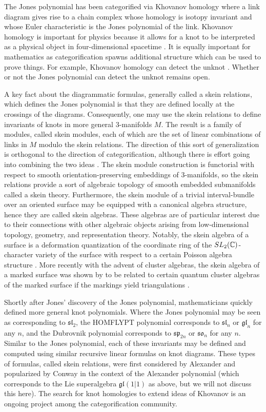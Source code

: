 The Jones polynomial has been categorified via Khovanov homology \cite{Kho00} where a link diagram gives rise to a chain complex whose homology is isotopy invariant and whose Euler characteristic is the Jones polynomial of the link. Khovanov homology is important for physics because it allows for a knot to be interpreted as a physical object in four-dimensional spacetime \cite{Wit12}. It is equally important for mathematics as categorification spawns additional structure which can be used to prove things. For example, Khovanov homology can detect the unknot \cite{KM11}. Whether or not the Jones polynomial can detect the unknot remains open.

A key fact about the diagrammatic formulas, generally called a skein relations, which defines the Jones polynomial is that they are defined locally at the crossings of the diagrams. Consequently, one may use the skein relations to define invariants of knots in more general $3$-manifolds $M$. The result is a family of modules, called skein modules, each of which are the set of linear combinations of links in $M$ modulo the skein relations. The direction of this sort of generalization is orthogonal to the direction of categorification, although there is effort going into combining the two ideas \cite{APS04}. The skein module construction is functorial with respect to smooth orientation-preserving embeddings of $3$-manifolds, so the skein relations provide a sort of algebraic topology of smooth embedded submanifolds called a skein theory. Furthermore, the skein module of a trivial interval-bundle over an oriented surface may be equipped with a canonical algebra structure, hence they are called skein algebras. These algebras are of particular interest due to their connections with other algebraic objects arising from low-dimensional topology, geometry, and representation theory. Notably, the skein algebra of a surface is a deformation quantization of the coordinate ring of the $SL_2(\mathbb{C})$-character variety of the surface with respect to a certain Poisson algebra structure \cite{BFK99}. More recently with the advent of cluster algebras, the skein algebra of a marked surface was shown by to be related to certain quantum cluster algebras of the marked surface if the markings yield triangulations \cite{Mul16}.

Shortly after Jones' discovery of the Jones polynomial, mathematicians quickly defined more general knot polynomials. Where the Jones polynomial may be seen as corresponding to $\mathfrak{sl}_2$, the HOMFLYPT polynomial \cite{FHLMOY85} \cite{PT88} corresponds to $\mathfrak{sl}_n$ or $\mathfrak{gl}_n$ for any $n$, and the Dubrovnik polynomial \cite{Kau90} corresponds to $\mathfrak{sp}_{2n}$ or $\mathfrak{so}_n$ for any $n$. Similar to the Jones polynomial, each of these invariants may be defined and computed using similar recursive linear formulas on knot diagrams. These types of formulas, called skein relations, were first considered by Alexander \cite{Ale28} and popularized by Conway \cite{Con70} in the context of the Alexander polynomial (which corresponds to the Lie superalgebra $\mathfrak{gl}(1|1)$ as above, but we will not discuss this here). The search for knot homologies to extend ideas of Khovanov is an ongoing project among the categorification community. 

